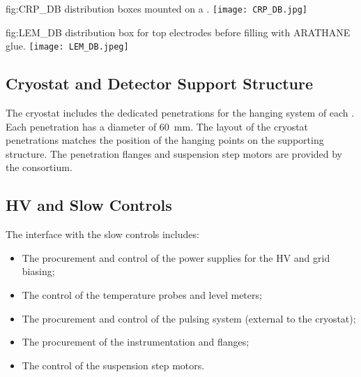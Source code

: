 \begin{dunefigure}
{fig:CRP_DB} 
{  distribution boxes mounted on a . }
  \texttt{[image: CRP\_DB.jpg]}
\end{dunefigure}


\begin{dunefigure}
{fig:LEM_DB} 
{ distribution box for  top electrodes before filling with ARATHANE glue. }
  \texttt{[image: LEM\_DB.jpeg]}
\end{dunefigure}



\subsection{Cryostat and Detector Support Structure}
\label{sec:fddp-crp-intfc-support}

The cryostat includes the dedicated penetrations for the hanging system of each . Each penetration has a diameter of \SI{60}{mm}. The layout of the cryostat penetrations   matches the position of the hanging points on the  supporting structure. The penetration flanges and  suspension step motors are provided by the  consortium.

\subsection{HV and Slow Controls}
\label{sec:fddp-crp-intfc-HV-slowcontrol}

The interface with the slow controls includes:

\begin{itemize}
\item The procurement and control of the power supplies for the HV and grid  biasing;
\item The control of the  temperature probes and level meters;
\item The procurement and control of the  pulsing system (external to the cryostat);
\item The procurement of the instrumentation and  \fdth flanges;
\item The control of the  suspension step motors.
\end{itemize}

